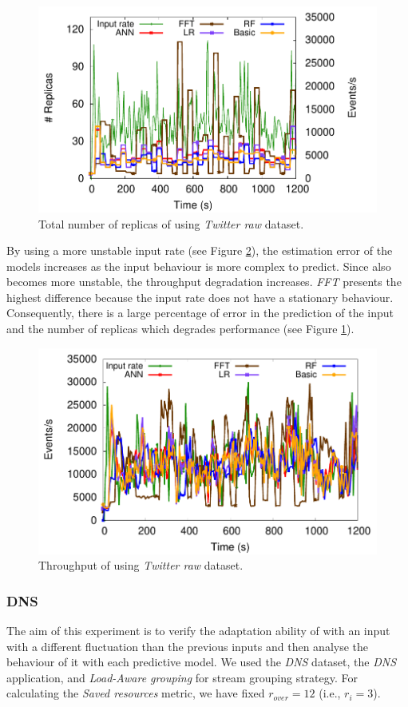 \begin{figure}[!ht]
     \centering
     \includegraphics[width=0.75\linewidth]{figures/exp/predictive/TwitterRaw-Replicas.pdf}
     \caption{Total number of replicas of \pSPS{} using \textit{Twitter raw} dataset.}
     \label{fig:exp-pa-twitter-raw-replicas}
\end{figure}


By using a more unstable input rate (see Figure \ref{fig:exp-pa-twitter-raw-throughput}), the estimation error of the models increases as the input behaviour is more complex to predict. Since \pSPS{} also becomes more unstable, the throughput degradation increases. \textit{FFT} presents the  highest difference because the input rate does not have a stationary behaviour. Consequently, there is a large percentage of error in the prediction of the input and the number of replicas which degrades performance (see Figure \ref{fig:exp-pa-twitter-raw-replicas}).

\begin{figure}[!ht]
     \centering
     \includegraphics[width=0.75\linewidth]{figures/exp/predictive/TwitterRaw-Throughput.pdf}
     \caption{Throughput of \pSPS{} using \textit{Twitter raw} dataset.}
     \label{fig:exp-pa-twitter-raw-throughput}
\end{figure}

\subsubsection{DNS}
The aim of this experiment is to verify the adaptation ability of \pSPS{} with an input with a different fluctuation than the previous inputs and then analyse the behaviour of it with each predictive model. We used the \textit{DNS} dataset, the \textit{DNS} application, and \textit{Load-Aware grouping} for stream grouping strategy. For calculating the \textit{Saved resources} metric, we have fixed $r_{over} = 12$ (i.e., $r_i = 3$).

